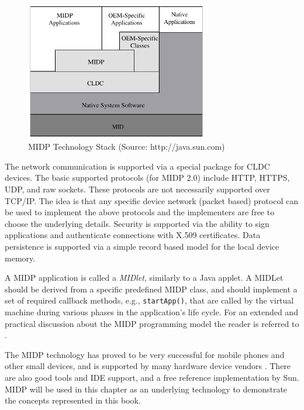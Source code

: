 \begin{figure}[ht]
	\begin{center}
		\includegraphics[width=8cm,height=!]{ch02/midp}
	\end{center}
	\caption{MIDP Technology Stack (Source: http://java.sun.com)}
	\label{fig:midp}
\end{figure}

The network communication is supported via a special package for CLDC devices. The basic supported protocols (for MIDP 2.0) include HTTP, HTTPS, UDP, and raw sockets. These protocols are not necessarily supported over TCP/IP. The idea is that any specific device network (packet based) protocol can be used to implement the above protocols and the implementers are free to choose the underlying details. Security is supported via the ability to sign applications and authenticate connections with X.509 certificates. Data persistence is supported via a simple record based model for the local device memory.

A MIDP application is called a \textit{MIDlet}, similarly to a Java applet. A MIDLet should be derived from a specific predefined MIDP class, and should implement a set of required callback methods, e.g., \texttt{startApp()}, that are called by the virtual machine during various phases in the application's life cycle. For an extended and practical discussion about the MIDP programming model the reader is referred to \cite{midp.practical}.

The MIDP technology has proved to be very successful for mobile phones and other small devices, and is supported by many hardware device vendors \cite{lawton.02,www.j2me.vendors,j2me.2005,www.nokia.tp}. There are also good tools and IDE support, and a free reference implementation by Sun. MIDP will be used in this chapter as an underlying technology to demonstrate the concepts represented in this book. 

